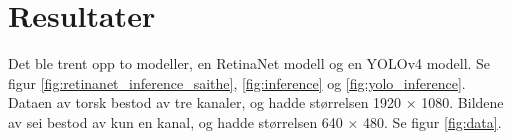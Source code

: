

\section{Resultater}
\label{part:results}

Det ble trent opp to modeller, en RetinaNet modell og en YOLOv4 modell. Se figur \ref{fig:retinanet_inference_saithe}, \ref{fig:inference} og \ref{fig:yolo_inference}. Dataen av torsk bestod av tre kanaler, og hadde størrelsen 1920 $\times$ 1080. Bildene av sei bestod av kun en kanal, og hadde størrelsen 640 $\times$ 480. Se figur \ref{fig:data}.



